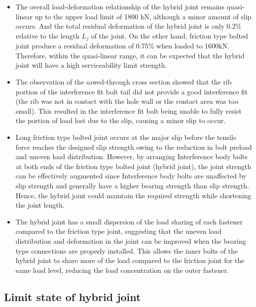 \begin{itemize}

\item The overall load-deformation relationship of the hybrid joint remains quasi-linear up to the upper load limit of 1800 kN, although a minor amount of slip occurs. And the total residual deformation of the hybrid joint is only 0.2\% relative to the length $L_j$ of the joint. On the other hand, friction type bolted joint produce a residual deformation of 0.75\% when loaded to 1600kN. Therefore, within the quasi-linear range, it can be expected that the hybrid joint will have a high serviceability limit strength.

\item The observation of the sawed-through cross section showed that the rib portion of the interference fit bolt tail did not provide a good interference fit (the rib was not in contact with the hole wall or the contact area was too small). This resulted in the interference fit bolt being unable to fully resist the portion of load lost due to the slip, causing a minor slip to occur. 

\item Long friction type bolted joint occurs at the major slip before the tensile force reaches the designed slip strength owing to the reduction in bolt preload and uneven load distribution. However, by arranging Interference body bolts at both ends of the friction type bolted joint (hybrid joint), the joint strength can be effectively augmented since Interference body bolts are unaffected by slip strength and generally have a higher bearing strength than slip strength. Hence, the hybrid joint could maintain the required strength while shortening the joint length.

\item The hybrid joint has a small dispersion of the load sharing of each fastener compared to the friction type joint, suggesting that the uneven load distribution and deformation in the joint can be improved when the bearing type connections are properly installed. This allows the inner bolts of the hybrid joint to share more of the load compared to the friction joint for the same load level, reducing the load concentration on the outer fastener.

\end{itemize}



\subsection*{Limit state of hybrid joint}

